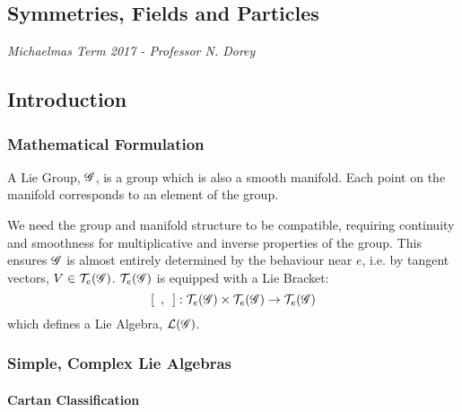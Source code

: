 \label{sfp}
\begin{chapterbox}
\vspace{-60pt}
\chapter{Symmetries, Fields and Particles}\label{chap:sfp}
\vspace{-30pt}
\centering\normalsize\textit{Michaelmas Term 2017 - Professor N. Dorey}
\end{chapterbox}
\vspace{20pt}
\minitoc
\newpage
\section{Introduction}
\subsection{Mathematical Formulation}

\begin{definitionbox}
A Lie Group, $\mathscr{G}$, is a group which is also a smooth manifold. Each point on the manifold corresponds to an element of the group.
\end{definitionbox}
We need the group and manifold structure to be compatible, requiring continuity and smoothness for multiplicative and inverse properties of the group. This ensures $\mathscr{G}$ is almost entirely determined by the behaviour near $e$, i.e. by tangent vectors, $V \in \mathcal{T}_e(\mathscr{G})$. $\mathcal{T}_e(\mathscr{G})$ is equipped with a Lie Bracket:
$$\left[\,\,\, , \,\,\,\right]:\mathcal{T}_e(\group)\times \mathcal{T}_e(\group) \rightarrow \mathcal{T}_e(\group)$$
which defines a Lie Algebra, $\mathcal{L}(\mathscr{G})$.   

\subsection{Simple, Complex Lie Algebras}

\subsubsection{Cartan Classification}

